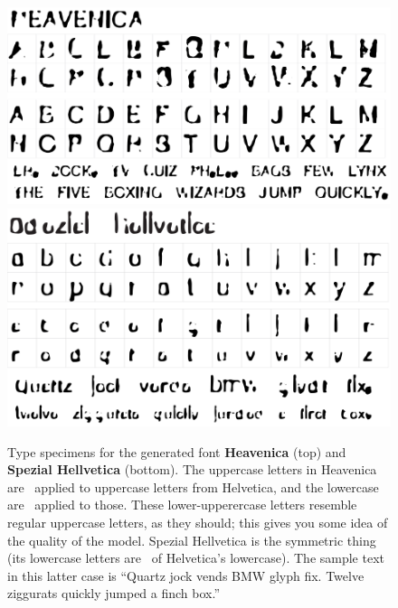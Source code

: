 \documentclass[twocolumn]{article}
\begin{document}
\begin{figure}[tp]
\centering
\includegraphics[width=0.9 \linewidth]{heavenica} \\[0.5in]
\includegraphics[width=0.9 \linewidth]{spezialhellvetica} \\
\caption{
  Type specimens for the generated font {\bf Heavenica} (top)
  and {\bf Spezial Hellvetica} (bottom). The uppercase letters
  in Heavenica are \makeuppercase\ applied to uppercase letters
  from Helvetica, and the lowercase are \makelowercase\ applied
  to those. These lower-upperercase letters resemble regular
  uppercase letters, as they should; this gives you some idea
  of the quality of the model. Spezial Hellvetica is the
  symmetric thing (its lowercase letters are \makelowercase\ 
  of Helvetica's lowercase). The sample text in this latter
  case is ``Quartz jock vends BMW glyph fix. Twelve ziggurats
  quickly jumped a finch box.''
} \label{fig:heavenica}
\end{figure}
\end{document}
